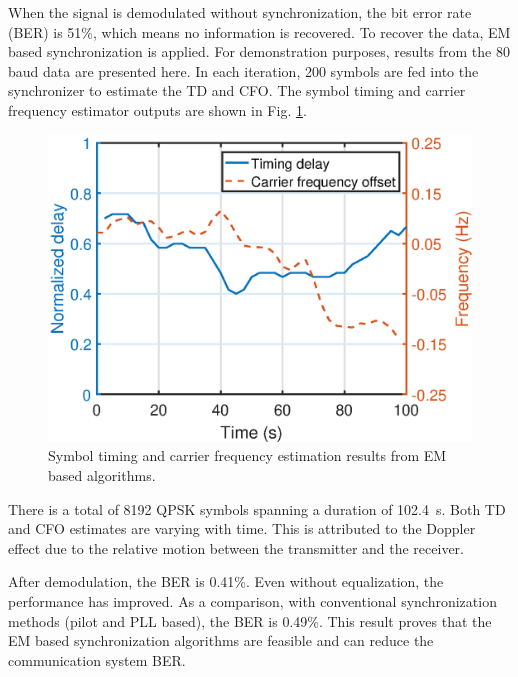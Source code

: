 \documentclass[journal,comsoc, onecolumn, 12pt,draftclsnofoot]{IEEEtran} %
\begin{document}
When the signal is demodulated without synchronization, the bit error rate (BER) is 51\%, which means no information is recovered.
To recover the data, EM based synchronization is applied.
For demonstration purposes, results from the 80 baud data are presented here.
In each iteration, 200 symbols are fed into the synchronizer to estimate the TD and CFO. 
The symbol timing and carrier frequency estimator outputs are shown in Fig. \ref{fig:per_exp}.

\begin{figure}[ht]
\centering
\includegraphics[width=3 in]{pic/per_exp.eps}
\caption{Symbol timing and carrier frequency estimation results from EM based algorithms.}
\label{fig:per_exp} 
\end{figure} 

There is a total of 8192 QPSK symbols spanning a duration of 102.4~s.
Both TD and CFO estimates are varying with time.
This is attributed to the Doppler effect due to the relative motion between the transmitter and the receiver.

After demodulation, the BER is 0.41\%. Even without equalization, the performance has improved. 
As a comparison, with conventional synchronization methods (pilot and PLL based), the BER is 0.49\%.
This result proves that the EM based synchronization algorithms are feasible and can reduce the communication system BER.
\end{document}

